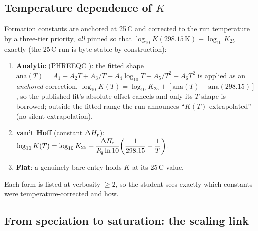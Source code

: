 \documentclass[11pt,a4paper]{article}
\newcommand{\Rgas}{R_{\!\mathrm{g}}}                %
\begin{document}
\subsection{Temperature dependence of \texorpdfstring{$K$}{K}}

Formation constants are anchored at 25\,\textdegree C and corrected to
the run temperature by a three-tier priority, \emph{all} pinned so that
$\log_{10}K(298.15\,\mathrm K)\equiv\log_{10}K_{25}$ exactly (the
25\,\textdegree C run is byte-stable by construction):
\begin{enumerate}[leftmargin=*,nosep,topsep=2pt]
  \item \textbf{Analytic} (PHREEQC ): the
        fitted shape $\mathrm{ana}(T)=A_1 + A_2 T + A_3/T + A_4\log_{10}T
        + A_5/T^2 + A_6 T^2$ is applied as an \emph{anchored} correction,
        $\log_{10}K(T)=\log_{10}K_{25} + [\mathrm{ana}(T) -
        \mathrm{ana}(298.15)]$, so the published fit's absolute offset
        cancels and only its $T$-shape is borrowed; outside the fitted
        range the run announces ``$K(T)$ extrapolated'' (no silent
        extrapolation).
  \item \textbf{van't Hoff} (constant $\Delta H_{\rm r}$):
        $\log_{10}K(T)=\log_{10}K_{25} + \dfrac{\Delta H_{\rm r}}{\Rgas\ln
        10}\!\left(\dfrac{1}{298.15}-\dfrac{1}{T}\right)$.
  \item \textbf{Flat}: a genuinely bare entry holds $K$ at its
        25\,\textdegree C value.
\end{enumerate}
Each form is listed at verbosity $\ge 2$, so the student sees exactly
which constants were temperature-corrected and how.

\subsection{From speciation to saturation: the scaling link}
\end{document}
